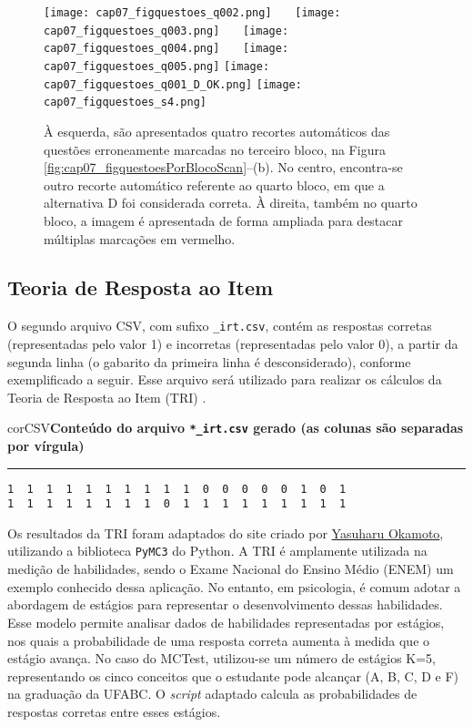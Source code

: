 \begin{figure}[!ht]
\centering
\texttt{[image: cap07\_figquestoes\_q002.png]} \ \ \ 
\texttt{[image: cap07\_figquestoes\_q003.png]} \ \ \ 
\texttt{[image: cap07\_figquestoes\_q004.png]} \ \ \ 
\texttt{[image: cap07\_figquestoes\_q005.png]} \hspace{11mm} 
\texttt{[image: cap07\_figquestoes\_q001\_D\_OK.png]} \hspace{11mm} 
\texttt{[image: cap07\_figquestoes\_s4.png]} \ \ \ 
\caption{À esquerda, são apresentados quatro recortes automáticos das questões erroneamente marcadas no terceiro bloco, na Figura \ref{fig:cap07_figquestoesPorBlocoScan}--(b). No centro, encontra-se outro recorte automático referente ao quarto bloco, em que a alternativa D foi considerada correta. À direita, também no quarto bloco, a imagem é apresentada de forma ampliada para destacar múltiplas marcações em vermelho.}
\label{fig:cap07_figquestoesPorBlocoScanErros}
\end{figure}

\subsection{Teoria de Resposta ao Item}

O segundo arquivo CSV, com sufixo \verb|_irt.csv|, contém as respostas corretas (representadas pelo valor 1) e incorretas (representadas pelo valor 0), a partir da segunda linha (o gabarito da primeira linha é desconsiderado), conforme exemplificado a seguir. Esse arquivo será utilizado para realizar os cálculos da Teoria de Resposta ao Item (TRI) \cite{birnbaum1968some}.

\begin{myboxCode}{corCSV}{\textbf{Conteúdo do arquivo \texttt{*\_irt.csv} gerado (as colunas são separadas por vírgula)}}\vspace{3mm}
\hrule
{\footnotesize
\begin{verbatim}
1  1  1  1  1  1  1  1  1  1  0  0  0  0  0  1  0  1
1  1  1  1  1  1  1  1  0  1  1  1  1  1  1  1  1  1
\end{verbatim}
}
\end{myboxCode}

Os resultados da TRI foram adaptados do site criado por \href{http://y-okamoto-psy1949.la.coocan.jp/Python/en1/IRTLClassPyMC3/}{Yasuharu Okamoto}, utilizando a biblioteca \verb|PyMC3| do Python. A TRI é amplamente utilizada na medição de habilidades, sendo o Exame Nacional do Ensino Médio (ENEM) um exemplo conhecido dessa aplicação. No entanto, em psicologia, é comum adotar a abordagem de estágios para representar o desenvolvimento dessas habilidades. Esse modelo permite analisar dados de habilidades representadas por estágios, nos quais a probabilidade de uma resposta correta aumenta à medida que o estágio avança. No caso do MCTest, utilizou-se um número de estágios K=5, representando os cinco conceitos que o estudante pode alcançar (A, B, C, D e F) na graduação da UFABC. O \textit{script} adaptado calcula as probabilidades de respostas corretas entre esses estágios.

